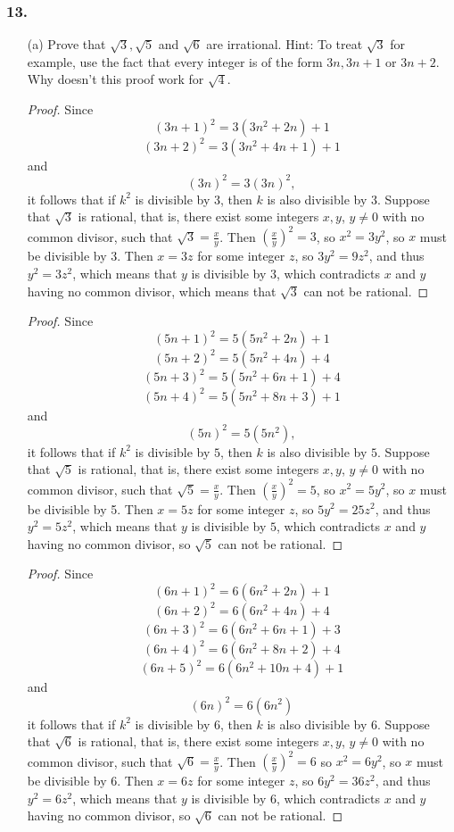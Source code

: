 \documentclass{article}
\begin{document}
\subsubsection*{13.}
\begin{enumerate}
	\item[(a)] Prove that $\sqrt{3}, \sqrt{5}$ and $\sqrt{6}$ are irrational. Hint: To treat $\sqrt{3}$ for example, use the fact that every integer is of the form $3n, 3n + 1$ or $3n + 2$. Why doesn't this proof work for $\sqrt{4}$.
	\begin{proof}
		Since \[ (3n + 1)^2 = 3(3n^2 + 2n) + 1 \]\[ (3n + 2)^2 = 3(3n^2 + 4n + 1) + 1 \] and \[ (3n)^2 = 3(3n)^2, \] it follows that if $k^2$ is divisible by $3$, then $k$ is also divisible by $3$. Suppose that $\sqrt{3}$ is rational, that is, there exist some integers $x, y$, $y\ne 0$ with no common divisor, such that $\sqrt{3} = \frac{x}{y}$. Then $(\frac{x}{y})^2 = 3$, so $x^2 = 3y^2$, so $x$ must be divisible by $3$. Then $x = 3z$ for some integer $z$, so $3y^2 = 9z^2$, and thus $y^2 = 3z^2$, which means that $y$ is divisible by $3$, which contradicts $x$ and $y$ having no common divisor, which means that $\sqrt{3}$ can not be rational.
	\end{proof}
	\begin{proof}
		Since \[ (5n + 1)^2  = 5(5n^2 + 2n) + 1 \]\[(5n + 2)^2 = 5(5n^2 + 4n) + 4\]\[(5n + 3)^2 = 5(5n^2 + 6n + 1) + 4\]\[(5n + 4)^2 = 5(5n^2 + 8n + 3) + 1\] and \[(5n)^2 = 5(5n^2),\] it follows that if $k^2$ is divisible by $5$, then $k$ is also divisible by $5$. Suppose that $\sqrt{5}$ is rational, that is, there exist some integers $x, y$, $y\ne 0$ with no common divisor, such that $\sqrt{5} = \frac{x}{y}$. Then $(\frac{x}{y})^2 = 5$, so $x^2 = 5y^2$, so $x$ must be divisible by 5. Then $x = 5z$ for some integer $z$, so $5y^2 = 25z^2$, and thus $y^2 = 5z^2$, which means that $y$ is divisible by $5$, which contradicts $x$ and $y$ having no common divisor, so $\sqrt{5}$ can not be rational.
	\end{proof}
	\begin{proof}
		Since \[(6n + 1)^2 = 6(6n^2 + 2n) + 1\]\[(6n + 2)^2 = 6(6n^2 + 4n) + 4\]\[(6n + 3)^2 = 6(6n^2 + 6n + 1) + 3\]\[(6n + 4)^2 = 6(6n^2 + 8n + 2) + 4\]\[(6n + 5)^2 = 6(6n^2 + 10n + 4) + 1\] and \[(6n)^2 = 6(6n^2)\]it follows that if $k^2$ is divisible by $6$, then $k$ is also divisible by $6$. Suppose that $\sqrt{6}$ is rational, that is, there exist some integers $x, y$, $y \ne 0$ with no common divisor, such that $\sqrt{6} = \frac{x}{y}$. Then $(\frac{x}{y})^2 = 6$ so $x^2 = 6y^2$, so $x$ must be divisible by $6$. Then $x = 6z$ for some integer $z$, so $6y^2 = 36z^2$, and thus $y^2 = 6z^2$, which means that $y$ is divisible by $6$, which contradicts $x$ and $y$ having no common divisor, so $\sqrt{6}$ can not be rational.

\end{proof}
\end{enumerate}
\end{document}
